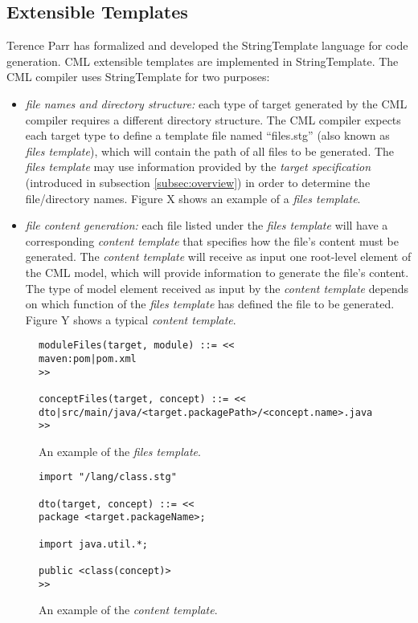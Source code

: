 \subsection{Extensible Templates}\label{subsec:templates}

Terence Parr has formalized and developed the StringTemplate \cite{st} language for code generation. CML extensible templates are implemented in StringTemplate. The CML compiler uses StringTemplate for two purposes:

\begin{itemize}
\item \emph{file names and directory structure:}
each type of target generated by the CML compiler requires a different directory structure.
The CML compiler expects each target type to define a template file named ``files.stg'' (also known as \emph{files template}),
which will contain the path of all files to be generated. The \emph{files template} may use information provided by the \emph{target specification} (introduced in subsection \ref{subsec:overview}) in order to determine the file/directory names. Figure X shows an example of a \emph{files template}.
\item \emph{file content generation:}
each file listed under the \emph{files template} will have a corresponding \emph{content template} that specifies how the file's content must be generated. The \emph{content template} will receive as input one root-level element of the CML model, which will provide information to generate the file's content. The type of model element received as input by the \emph{content template} depends on which function of the \emph{files template} has defined the file to be generated. Figure Y shows a typical \emph{content template}. 
\end{itemize}

\begin{figure}
\verbatimfont{\small}
\begin{verbatim}
moduleFiles(target, module) ::= <<
maven:pom|pom.xml
>>

conceptFiles(target, concept) ::= <<
dto|src/main/java/<target.packagePath>/<concept.name>.java
>>
\end{verbatim}
\caption{An example of the \emph{files template}.}
\label{fig:template1}
\end{figure}

\begin{figure}
\verbatimfont{\small}
\begin{verbatim}
import "/lang/class.stg"

dto(target, concept) ::= <<
package <target.packageName>;

import java.util.*;

public <class(concept)>
>>
\end{verbatim}
\caption{An example of the \emph{content template}.}
\label{fig:template2}
\end{figure}

